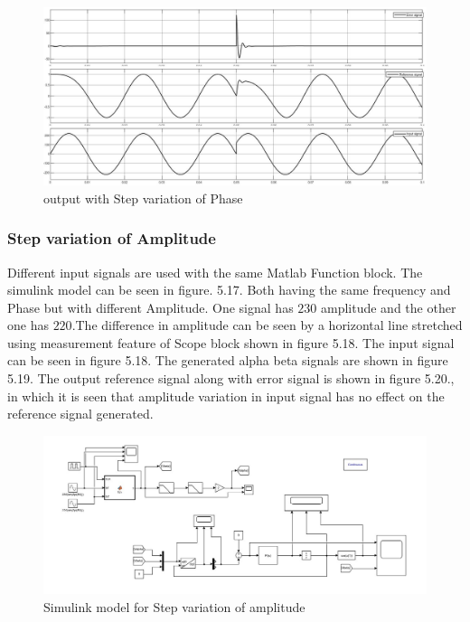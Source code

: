 \documentclass[a4paper,12pt]{iitmdiss}
\begin{document}
\begin{figure}[hbt!]
    \centering
    \includegraphics[width=1.0\textwidth]{output_phase.jpg}
    \caption{output with Step variation of Phase}
\end{figure}

\subsubsection{Step variation of Amplitude}

Different input signals are used with the same Matlab Function block. The simulink model can be seen in figure. 5.17.
Both having the same frequency and Phase but with different Amplitude. One signal has $230$ amplitude and the other one has $220$.The difference in amplitude can be seen by a horizontal line stretched using measurement feature of Scope block shown in figure 5.18. The input signal can be seen in figure 5.18. The generated alpha beta signals are shown in figure 5.19. The output reference signal along with error signal is shown in figure 5.20., in which it is seen that amplitude variation in input signal has no effect on the reference signal generated.
\begin{figure}[hbt!]
    \centering
    \includegraphics[width=1.0\textwidth]{Step variation of amplitude.jpg}
    \caption{Simulink model for Step variation of amplitude}
\end{figure}
\end{document}
